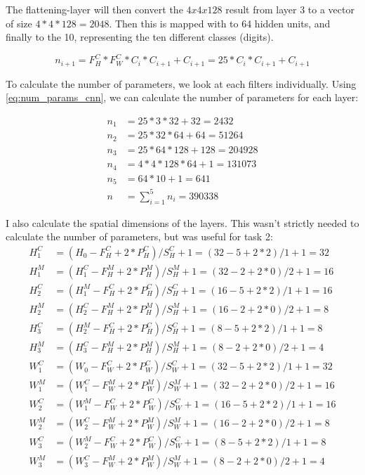 The flattening-layer will then convert the $4x4x128$ result from layer 3 to a vector of size $4 * 4 * 128 = 2048$. Then this is mapped with to 64 hidden units, and finally to the 10, representing the ten different classes (digits). 

\begin{equation}
    \label{eq:num_params_cnn}
    n_{i+1} = F_H^C * F_W^C * C_i * C_{i+1} + C_{i+1} = 25 * C_i * C_{i+1} + C_{i+1} 
\end{equation}

To calculate the number of parameters, we look at each filters individually. Using \cref{eq:num_params_cnn}, we can calculate the number of parameters for each layer: 

\begin{align*}
    n_1 &= 25 * 3  * 32  + 32 = 2432 \\
    n_2 &= 25 * 32 * 64  + 64 = 51264 \\
    n_3 &= 25 * 64 * 128 + 128 = 204928 \\
    n_4 &= 4 * 4 * 128 * 64 + 1 = 131073 \\
    n_5 &= 64 * 10 + 1 = 641 \\
    n   &= \sum_{i = 1}^5 n_i = 390338
\end{align*}

I also calculate the spatial dimensions of the layers. This wasn't strictly needed to calculate the number of parameters, but was useful for task 2: 
\begin{align*}
    H_1^C &= (H_0 - F_H^C + 2 * P_H^C) / S_H^C + 1   = (32 - 5 + 2 * 2) / 1 + 1 = 32 \\
    H_1^M &= (H_1^C - F_H^M + 2 * P_H^M) / S_H^M + 1 = (32 - 2 + 2 * 0) / 2 + 1 = 16 \\
    H_2^C &= (H_1^M - F_H^C + 2 * P_H^C) / S_H^C + 1 = (16 - 5 + 2 * 2) / 1 + 1 = 16 \\
    H_2^M &= (H_2^C - F_H^M + 2 * P_H^M) / S_H^M + 1 = (16 - 2 + 2 * 0) / 2 + 1 = 8 \\
    H_3^C &= (H_2^M - F_H^C + 2 * P_H^C) / S_H^C + 1 = (8  - 5 + 2 * 2) / 1 + 1 = 8 \\
    H_3^M &= (H_3^C - F_H^M + 2 * P_H^M) / S_H^M + 1 = (8  - 2 + 2 * 0) / 2 + 1 = 4 \\
    W_1^C &= (W_0 - F_W^C + 2 * P_W^C) / S_W^C + 1   = (32 - 5 + 2 * 2) / 1 + 1 = 32 \\
    W_1^M &= (W_1^C - F_W^M + 2 * P_W^M) / S_W^M + 1 = (32 - 2 + 2 * 0) / 2 + 1 = 16 \\
    W_2^C &= (W_1^M - F_W^C + 2 * P_W^C) / S_W^C + 1 = (16 - 5 + 2 * 2) / 1 + 1 = 16 \\
    W_2^M &= (W_2^C - F_W^M + 2 * P_W^M) / S_W^M + 1 = (16 - 2 + 2 * 0) / 2 + 1 = 8 \\
    W_3^C &= (W_2^M - F_W^C + 2 * P_W^C) / S_W^C + 1 = (8  - 5 + 2 * 2) / 1 + 1 = 8 \\
    W_3^M &= (W_3^C - F_W^M + 2 * P_W^M) / S_W^M + 1 = (8  - 2 + 2 * 0) / 2 + 1 = 4 
\end{align*}

